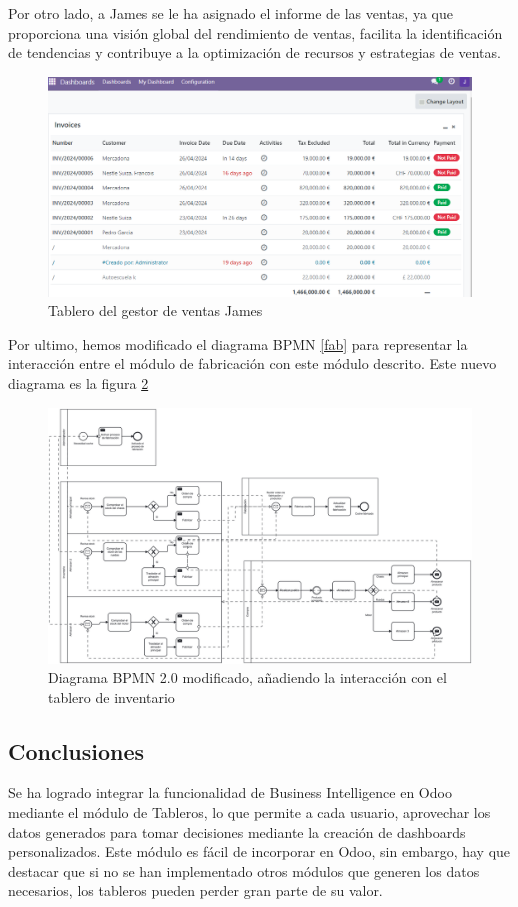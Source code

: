 Por otro lado, a James se le ha asignado el informe de las ventas, ya que proporciona una visión global del rendimiento de ventas, facilita la identificación de tendencias y contribuye a la optimización de recursos y estrategias de ventas.
\newpage
\begin{figure}[h]
    \centering
    \includegraphics[width=1\linewidth]{fotosDecisiones/james.png}
    \caption{Tablero del gestor de ventas James}
    \label{fig:enter-label}
\end{figure}

Por ultimo, hemos modificado el diagrama BPMN \ref{fab} para representar la interacción entre el módulo de fabricación con este módulo descrito. Este nuevo diagrama es la figura \ref{bi}

\begin{figure}[h]
    \centering
    \includegraphics[width=1\linewidth]{fotosGestFab/BI.png}
    \caption{Diagrama BPMN 2.0 modificado, añadiendo la interacción con el tablero de inventario}
    \label{bi}
\end{figure}
\subsection{Conclusiones}
Se ha logrado integrar la funcionalidad de Business Intelligence en Odoo mediante el módulo de Tableros, lo que permite a cada usuario, aprovechar los datos generados para tomar decisiones mediante la creación de dashboards personalizados. Este módulo es fácil de incorporar en Odoo, sin embargo, hay que destacar que si no se han implementado otros módulos que generen los datos necesarios, los tableros pueden perder gran parte de su valor.
